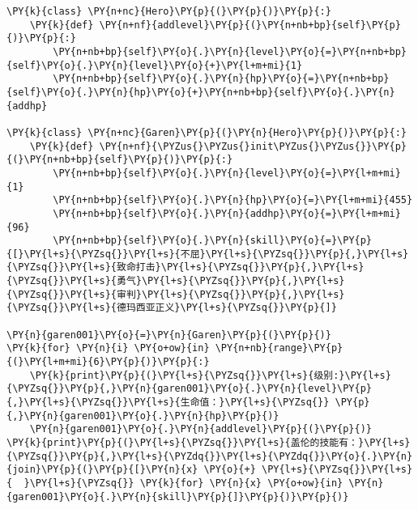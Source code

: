 \begin{Verbatim}[commandchars=\\\{\}]
\PY{k}{class} \PY{n+nc}{Hero}\PY{p}{(}\PY{p}{)}\PY{p}{:}
    \PY{k}{def} \PY{n+nf}{addlevel}\PY{p}{(}\PY{n+nb+bp}{self}\PY{p}{)}\PY{p}{:}
        \PY{n+nb+bp}{self}\PY{o}{.}\PY{n}{level}\PY{o}{=}\PY{n+nb+bp}{self}\PY{o}{.}\PY{n}{level}\PY{o}{+}\PY{l+m+mi}{1}
        \PY{n+nb+bp}{self}\PY{o}{.}\PY{n}{hp}\PY{o}{=}\PY{n+nb+bp}{self}\PY{o}{.}\PY{n}{hp}\PY{o}{+}\PY{n+nb+bp}{self}\PY{o}{.}\PY{n}{addhp}

\PY{k}{class} \PY{n+nc}{Garen}\PY{p}{(}\PY{n}{Hero}\PY{p}{)}\PY{p}{:}
    \PY{k}{def} \PY{n+nf}{\PYZus{}\PYZus{}init\PYZus{}\PYZus{}}\PY{p}{(}\PY{n+nb+bp}{self}\PY{p}{)}\PY{p}{:}
        \PY{n+nb+bp}{self}\PY{o}{.}\PY{n}{level}\PY{o}{=}\PY{l+m+mi}{1}
        \PY{n+nb+bp}{self}\PY{o}{.}\PY{n}{hp}\PY{o}{=}\PY{l+m+mi}{455}
        \PY{n+nb+bp}{self}\PY{o}{.}\PY{n}{addhp}\PY{o}{=}\PY{l+m+mi}{96}
        \PY{n+nb+bp}{self}\PY{o}{.}\PY{n}{skill}\PY{o}{=}\PY{p}{[}\PY{l+s}{\PYZsq{}}\PY{l+s}{不屈}\PY{l+s}{\PYZsq{}}\PY{p}{,}\PY{l+s}{\PYZsq{}}\PY{l+s}{致命打击}\PY{l+s}{\PYZsq{}}\PY{p}{,}\PY{l+s}{\PYZsq{}}\PY{l+s}{勇气}\PY{l+s}{\PYZsq{}}\PY{p}{,}\PY{l+s}{\PYZsq{}}\PY{l+s}{审判}\PY{l+s}{\PYZsq{}}\PY{p}{,}\PY{l+s}{\PYZsq{}}\PY{l+s}{德玛西亚正义}\PY{l+s}{\PYZsq{}}\PY{p}{]}

\PY{n}{garen001}\PY{o}{=}\PY{n}{Garen}\PY{p}{(}\PY{p}{)}
\PY{k}{for} \PY{n}{i} \PY{o+ow}{in} \PY{n+nb}{range}\PY{p}{(}\PY{l+m+mi}{6}\PY{p}{)}\PY{p}{:}
    \PY{k}{print}\PY{p}{(}\PY{l+s}{\PYZsq{}}\PY{l+s}{级别:}\PY{l+s}{\PYZsq{}}\PY{p}{,}\PY{n}{garen001}\PY{o}{.}\PY{n}{level}\PY{p}{,}\PY{l+s}{\PYZsq{}}\PY{l+s}{生命值：}\PY{l+s}{\PYZsq{}} \PY{p}{,}\PY{n}{garen001}\PY{o}{.}\PY{n}{hp}\PY{p}{)}
    \PY{n}{garen001}\PY{o}{.}\PY{n}{addlevel}\PY{p}{(}\PY{p}{)}
\PY{k}{print}\PY{p}{(}\PY{l+s}{\PYZsq{}}\PY{l+s}{盖伦的技能有：}\PY{l+s}{\PYZsq{}}\PY{p}{,}\PY{l+s}{\PYZdq{}}\PY{l+s}{\PYZdq{}}\PY{o}{.}\PY{n}{join}\PY{p}{(}\PY{p}{[}\PY{n}{x} \PY{o}{+} \PY{l+s}{\PYZsq{}}\PY{l+s}{  }\PY{l+s}{\PYZsq{}} \PY{k}{for} \PY{n}{x} \PY{o+ow}{in} \PY{n}{garen001}\PY{o}{.}\PY{n}{skill}\PY{p}{]}\PY{p}{)}\PY{p}{)}
\end{Verbatim}

